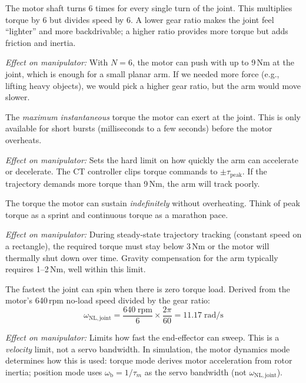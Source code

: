 \documentclass[11pt,a4paper]{article}
\newcommand{\wb}{\omega_{\mathrm{b}}}
\begin{document}
\begin{description}[leftmargin=2em, style=nextline, font=\bfseries\sffamily\color{seaorange}]

\item[Gear ratio ($N = 6$)]
The motor shaft turns 6 times for every single turn of the joint.  This multiplies torque by 6 but divides speed by 6.  A lower gear ratio makes the joint feel ``lighter'' and more backdrivable; a higher ratio provides more torque but adds friction and inertia.

\textit{Effect on manipulator:}  With $N=6$, the motor can push with up to 9\,Nm at the joint, which is enough for a small planar arm.  If we needed more force (e.g., lifting heavy objects), we would pick a higher gear ratio, but the arm would move slower.

\item[Peak torque ($\tau_{\mathrm{peak}} = 9.0$\,Nm)]
The \emph{maximum instantaneous} torque the motor can exert at the joint.  This is only available for short bursts (milliseconds to a few seconds) before the motor overheats.

\textit{Effect on manipulator:}  Sets the hard limit on how quickly the arm can accelerate or decelerate.  The CT controller clips torque commands to $\pm\tau_{\mathrm{peak}}$.  If the trajectory demands more torque than 9\,Nm, the arm will track poorly.

\item[Continuous torque ($\tau_{\mathrm{cont}} = 3.0$\,Nm)]
The torque the motor can sustain \emph{indefinitely} without overheating.  Think of peak torque as a sprint and continuous torque as a marathon pace.

\textit{Effect on manipulator:}  During steady-state trajectory tracking (constant speed on a rectangle), the required torque must stay below 3\,Nm or the motor will thermally shut down over time.  Gravity compensation for the arm typically requires 1--2\,Nm, well within this limit.

\item[No-load joint speed ($\omega_{\mathrm{NL,joint}} = 11.17$\,rad/s $\approx$ 107\,rpm)]
The fastest the joint can spin when there is zero torque load.  Derived from the motor's 640\,rpm no-load speed divided by the gear ratio:
\begin{equation}
    \omega_{\mathrm{NL,joint}} = \frac{640 \;\text{rpm}}{6} \times \frac{2\pi}{60} = 11.17 \;\text{rad/s}
\end{equation}

\textit{Effect on manipulator:}  Limits how fast the end-effector can sweep.  This is a \emph{velocity} limit, not a servo bandwidth.  In simulation, the motor dynamics mode determines how this is used: torque mode derives motor acceleration from rotor inertia; position mode uses $\wb = 1/\tau_m$ as the servo bandwidth (not $\omega_{\mathrm{NL,joint}}$).


\end{description}
\end{document}
